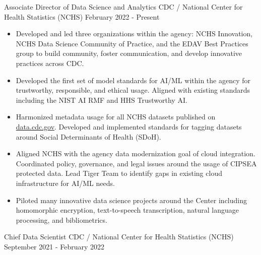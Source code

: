 \documentclass[]{scrartcl}
\begin{document}
\begin{cleanCV}


  \vspace{-1em}

\WorkExperience
{}
{Associate Director of Data Science and Analytics}
{
  \newline CDC / National Center for Health Statistics (NCHS)
  \newline February 2022 - Present
}
{
  \vspace{-1.50em}
  \begin{itemize}

  \item Developed and led three organizations within the agency: NCHS Innovation, NCHS Data Science Community of Practice, and the EDAV Best Practices group to build community, foster communication, and develop innovative practices across CDC.
  \item Developed the first set of model standards for AI/ML within the agency for trustworthy, responsible, and ethical usage. Aligned with existing standards including the NIST AI RMF and HHS Trustworthy AI.
  \item Harmonized metadata usage for all NCHS datasets published on \href{https://data.cdc.gov/browse?category=NCHS}{data.cdc.gov}. Developed and implemented standards for tagging datasets around Social Determinants of Health (SDoH).
  \item Aligned NCHS with the agency data modernization goal of cloud integration. Coordinated policy, governance, and legal issues around the usage of CIPSEA protected data. Lead Tiger Team to identify gaps in existing cloud infrastructure for AI/ML needs.
    \item Piloted many innovative data science projects around the Center including homomorphic encryption, text-to-speech transcription, natural language processing, and bibliometrics.

  \end{itemize}
}

    
  \WorkExperience
{}
{Chief Data Scientist}
{
  \newline CDC / National Center for Health Statistics (NCHS)
  \newline September 2021 - February 2022
}
{
  \vspace{-1.5em}
  \begin{itemize}


\end{itemize}}
\end{cleanCV}
\end{document}
